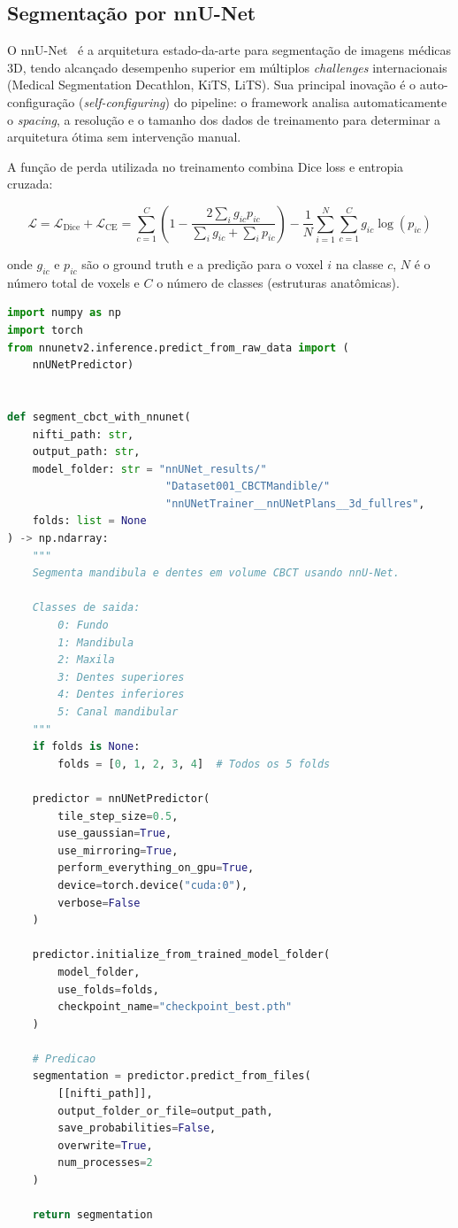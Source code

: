 \subsection{Segmentação por nnU-Net}
\label{subsec:nnunet}

O nnU-Net~\cite{isensee2021nnuet} é a arquitetura estado-da-arte para segmentação de imagens médicas 3D, tendo alcançado desempenho superior em múltiplos \textit{challenges} internacionais (Medical Segmentation Decathlon, KiTS, LiTS). Sua principal inovação é o auto-configuração (\textit{self-configuring}) do pipeline: o framework analisa automaticamente o \textit{spacing}, a resolução e o tamanho dos dados de treinamento para determinar a arquitetura ótima sem intervenção manual.

A função de perda utilizada no treinamento combina Dice loss e entropia cruzada:

\begin{equation}
\label{eq:loss-nnunet}
\mathcal{L} = \mathcal{L}_{\text{Dice}} + \mathcal{L}_{\text{CE}} = \sum_{c=1}^{C} \left(1 - \frac{2 \sum_{i} g_{ic} p_{ic}}{\sum_{i} g_{ic} + \sum_{i} p_{ic}}\right) - \frac{1}{N} \sum_{i=1}^{N} \sum_{c=1}^{C} g_{ic} \log(p_{ic})
\end{equation}

onde $g_{ic}$ e $p_{ic}$ são o ground truth e a predição para o voxel $i$ na classe $c$, $N$ é o número total de voxels e $C$ o número de classes (estruturas anatômicas).

\begin{lstlisting}[language=Python, caption=Inferencia de segmentacao ossea com nnU-Net, label=code:nnunet-infer]
import numpy as np
import torch
from nnunetv2.inference.predict_from_raw_data import (
    nnUNetPredictor)


def segment_cbct_with_nnunet(
    nifti_path: str,
    output_path: str,
    model_folder: str = "nnUNet_results/"
                         "Dataset001_CBCTMandible/"
                         "nnUNetTrainer__nnUNetPlans__3d_fullres",
    folds: list = None
) -> np.ndarray:
    """
    Segmenta mandibula e dentes em volume CBCT usando nnU-Net.

    Classes de saida:
        0: Fundo
        1: Mandibula
        2: Maxila
        3: Dentes superiores
        4: Dentes inferiores
        5: Canal mandibular
    """
    if folds is None:
        folds = [0, 1, 2, 3, 4]  # Todos os 5 folds

    predictor = nnUNetPredictor(
        tile_step_size=0.5,
        use_gaussian=True,
        use_mirroring=True,
        perform_everything_on_gpu=True,
        device=torch.device("cuda:0"),
        verbose=False
    )

    predictor.initialize_from_trained_model_folder(
        model_folder,
        use_folds=folds,
        checkpoint_name="checkpoint_best.pth"
    )

    # Predicao
    segmentation = predictor.predict_from_files(
        [[nifti_path]],
        output_folder_or_file=output_path,
        save_probabilities=False,
        overwrite=True,
        num_processes=2
    )

    return segmentation
\end{lstlisting}

